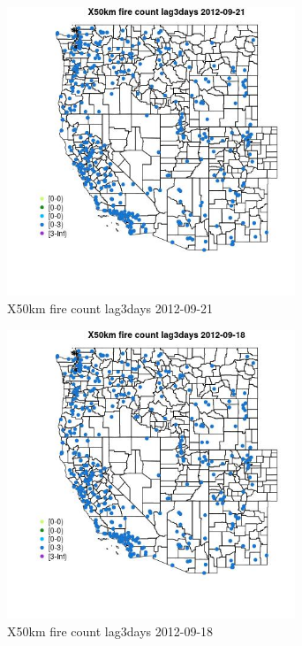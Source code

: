 \begin{figure} 
\centering  
\includegraphics[width=0.77\textwidth]{Code_Outputs/Report_ML_input_PM25_Step4_part_e_de_duplicated_aves_compiled_2019-05-14wNAs_MapObsX50km_fire_count_lag3days2012-09-21.jpg} 
\caption{\label{fig:Report_ML_input_PM25_Step4_part_e_de_duplicated_aves_compiled_2019-05-14wNAsMapObsX50km_fire_count_lag3days2012-09-21}X50km fire count lag3days 2012-09-21} 
\end{figure} 
 

\begin{figure} 
\centering  
\includegraphics[width=0.77\textwidth]{Code_Outputs/Report_ML_input_PM25_Step4_part_e_de_duplicated_aves_compiled_2019-05-14wNAs_MapObsX50km_fire_count_lag3days2012-09-18.jpg} 
\caption{\label{fig:Report_ML_input_PM25_Step4_part_e_de_duplicated_aves_compiled_2019-05-14wNAsMapObsX50km_fire_count_lag3days2012-09-18}X50km fire count lag3days 2012-09-18} 
\end{figure} 
 

